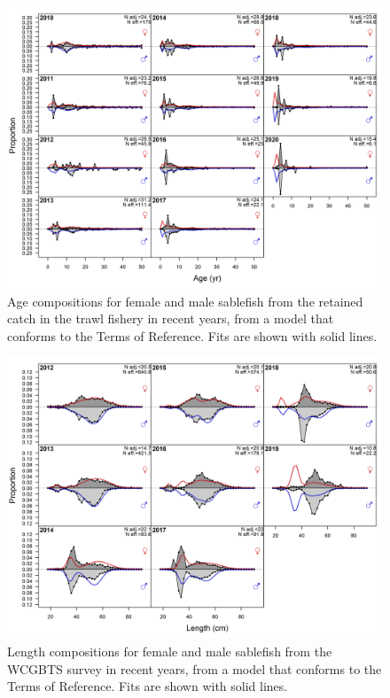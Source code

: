\documentclass[11pt,
  english,
  a4paper,
]{article}
\begin{document}
\tagmcend\tagstructend


\begin{figure}
\centering
\includegraphics[width=1\textwidth,height=1\textheight]{figs/tora_fleet3_agecomps.png}
\caption{Age compositions for female and male sablefish from the retained catch in the trawl fishery in recent years, from a model that conforms to the Terms of Reference. Fits are shown with solid lines. \label{fig:torafleet3agecomps}}
\end{figure}

\tagmcend\tagstructend


\begin{figure}
\centering
\includegraphics[width=1\textwidth,height=1\textheight]{figs/tora_fleet8_lencomps.png}
\caption{Length compositions for female and male sablefish from the WCGBTS survey in recent years, from a model that conforms to the Terms of Reference. Fits are shown with solid lines. \label{fig:torafleet8lencomps}}
\end{figure}
\end{document}
